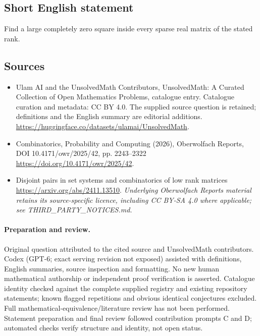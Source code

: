 \documentclass[11pt]{article}
\begin{document}
\subsection{Short English statement}
Find a large completely zero square inside every sparse real matrix of the stated rank.
\subsection{Sources}
\begin{itemize}
\item[\hypertarget{source:statement:1}{S1}] Ulam AI and the UnsolvedMath Contributors, UnsolvedMath: A Curated Collection of Open Mathematics Problems, catalogue entry. Catalogue curation and metadata: CC BY 4.0. The supplied source question is retained; definitions and the English summary are editorial additions.
\url{https://huggingface.co/datasets/ulamai/UnsolvedMath}.
\item[\hypertarget{source:statement:2}{S2}] Combinatorics, Probability and Computing (2026), Oberwolfach Reports, DOI 10.4171/owr/2025/42, pp. 2243--2322
\url{https://doi.org/10.4171/owr/2025/42}.
\item[\hypertarget{source:statement:3}{S3}] Disjoint pairs in set systems and combinatorics of low rank matrices
\url{https://arxiv.org/abs/2411.13510}.
\textit{Underlying Oberwolfach Reports material retains its source-specific licence, including CC BY-SA 4.0 where applicable; see THIRD\_PARTY\_NOTICES.md.}
\end{itemize}
\paragraph{Preparation and review.}
Original question attributed to the cited source and UnsolvedMath contributors. Codex (GPT-6; exact serving revision not exposed) assisted with definitions, English summaries, source inspection and formatting. No new human mathematical authorship or independent proof verification is asserted. Catalogue identity checked against the complete supplied registry and existing repository statements; known flagged repetitions and obvious identical conjectures excluded. Full mathematical-equivalence/literature review has not been performed. Statement preparation and final review followed contribution prompts C and D; automated checks verify structure and identity, not open status.
\label{end:statement}
\end{document}
